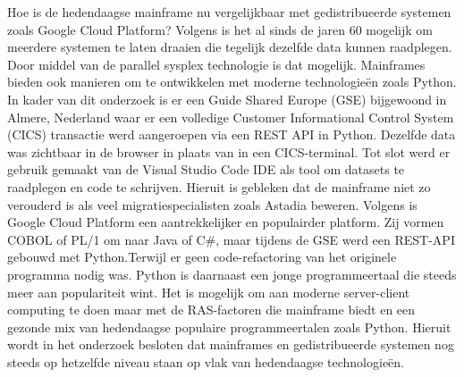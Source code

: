 Hoe is de hedendaagse mainframe nu vergelijkbaar met gedistribueerde systemen zoals Google Cloud Platform? Volgens \textcite{Sarkar2020} is het al sinds de jaren 60 mogelijk om meerdere systemen te laten draaien die tegelijk dezelfde data kunnen raadplegen. Door middel van de parallel sysplex technologie is dat mogelijk. Mainframes bieden ook manieren om te ontwikkelen met moderne technologieën zoals Python. In kader van dit onderzoek is er een Guide Shared Europe (GSE) bijgewoond in Almere, Nederland waar er een volledige Customer Informational Control System (CICS) transactie werd aangeroepen via een REST API in Python. Dezelfde data was zichtbaar in de browser in plaats van in een CICS-terminal. Tot slot werd er gebruik gemaakt van de Visual Studio Code IDE als tool om datasets te raadplegen en code te schrijven. Hieruit is gebleken dat de mainframe niet zo verouderd is als veel migratiespecialisten zoals Astadia beweren. Volgens \autocite{Astadia2021} is Google Cloud Platform een aantrekkelijker en populairder platform. Zij vormen COBOL of PL/1  om naar Java of C\#, maar tijdens de GSE werd een REST-API gebouwd met Python.Terwijl er geen code-refactoring van het originele programma nodig was. Python is daarnaast een jonge programmeertaal die steeds meer aan populariteit wint.  Het is mogelijk om aan moderne server-client computing te doen maar met de RAS-factoren die mainframe biedt en een gezonde mix van hedendaagse populaire programmeertalen zoals Python. Hieruit wordt in het onderzoek besloten dat mainframes en gedistribueerde systemen nog steeds op hetzelfde niveau staan op vlak van hedendaagse technologieën. 

